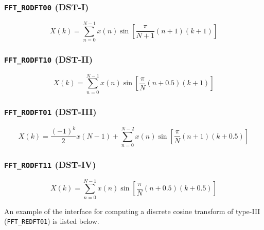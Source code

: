 \subsubsection{{\tt FFT\_RODFT00} (DST-I)}
\label{module:fft:r2r:RODFT00}
    \begin{equation}
    \label{eqn:fft:dst-I}
        X(k) =  \sum_{n=0}^{N-1}{
                    x(n) \sin\left[
                        \frac{\pi}{N+1}(n+1)(k+1)
                    \right]
                }
    \end{equation}

\subsubsection{{\tt FFT\_RODFT10} (DST-II)}
\label{module:fft:r2r:RODFT10}
    \begin{equation}
    \label{eqn:fft:dst-II}
        X(k) =  \sum_{n=0}^{N-1}{
                    x(n) \sin\left[
                        \frac{\pi}{N}(n+0.5)(k+1)
                    \right]
                }
    \end{equation}

\subsubsection{{\tt FFT\_RODFT01} (DST-III)}
\label{module:fft:r2r:RODFT01}
    \begin{equation}
    \label{eqn:fft:dst-III}
        X(k) =  \frac{(-1)^k}{2}x(N-1) + 
                \sum_{n=0}^{N-2}{
                    x(n) \sin\left[
                        \frac{\pi}{N}(n+1)(k+0.5)
                    \right]
                }
    \end{equation}

\subsubsection{{\tt FFT\_RODFT11} (DST-IV)}
\label{module:fft:r2r:RODFT11}
    \begin{equation}
    \label{eqn:fft:dst-IV}
        X(k) =  \sum_{n=0}^{N-1}{
                    x(n) \sin\left[
                        \frac{\pi}{N}(n+0.5)(k+0.5)
                    \right]
                }
    \end{equation}

An example of the interface for computing a discrete cosine transform
of type-III ({\tt FFT\_REDFT01}) is listed below.
%


